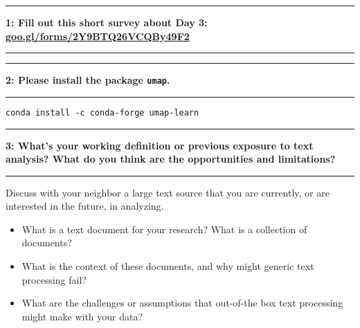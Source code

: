 \documentclass[11pt]{article}
\newcommand\question[2]{\vspace{.25in}\hrule\textbf{#1: #2}\vspace{.5em}\hrule\vspace{.10in}}
\begin{document}
\raggedright
\newcommand\NAME{Allie Morgan} 

\vspace{-0.2 in}
\question{1}{Fill out this short survey about Day 3: \href{https://goo.gl/forms/2Y9BTQ26VCQBy49F2}{goo.gl/forms/2Y9BTQ26VCQBy49F2}} 
\vspace{1 in}

\question{2}{Please install the package \texttt{umap}.}
\texttt{conda install -c conda-forge umap-learn}
\vspace{1 in}

\question{3}{What's your working definition or previous exposure to text analysis? What do you think are the opportunities and limitations?}

Discuss with your neighbor a large text source that you are currently, or are interested in the future, in analyzing. 
\begin{itemize}
\item What is a text document for your research? What is a collection of documents? 
\item What is the context of these documents, and why might generic text processing fail? 
\item What are the challenges or assumptions that out-of-the box text processing might make with your data?
\end{itemize}
\end{document}
